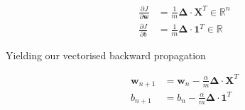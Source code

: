 \documentclass[varwidth,border=2cm]{standalone}
\begin{document}
\begin{align}
\frac{\partial J}{\partial \bm w} &= \frac{1}{m} \bm\Delta \cdot \bm X^T \in \mathbb{R}^n\\
\frac{\partial J}{\partial b} &= \frac{1}{m} \bm\Delta \cdot \bm 1^T \in \mathbb{R} \nonumber
\end{align}

Yielding our vectorised backward propagation

\begin{align}
\bm w_{n+1} &= \bm w_n - \frac{\alpha}{m}\bm\Delta \cdot \bm X^T \\
b_{n+1} &= b_n - \frac{\alpha}{m} \bm\Delta \cdot \bm 1^T \nonumber
\end{align}
\end{document}
